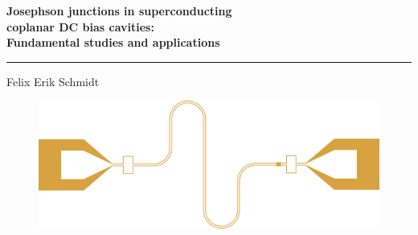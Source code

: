 \documentclass{dissertation-edit}
\begin{document}
{\linespread{1.1}\raggedright\bfseries\Huge Josephson junctions in superconducting\\ coplanar DC bias cavities:\\
	Fundamental studies and applications\par
\vspace{0.5cm}
\hrule height 2pt
\vspace{0.5cm}
\normalfont\LARGE Felix Erik Schmidt	
}
\begin{figure}[b]
	\includegraphics[width=\linewidth]{../title/cover_circuit/nazca_export_post.pdf}
\end{figure}


\end{document}
